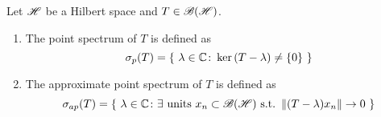 \documentclass[a4paper,11pt]{report}
\begin{document}
\begin{defn}
	Let $\mathscr{H}$ be a Hilbert space and $T \in \mathscr{B(H)}$.
	\begin{enumerate}[label=\arabic*)]
		\item The point spectrum of $T$ is defined as
		\begin{equation*}
			\sigma_p(T) = \{~ \lambda \in \mathbb{C} \colon \ker{(T-\lambda)} \neq \{0\}~\}
		\end{equation*}
		\item The approximate point spectrum of $T$ is defined as 
		\begin{equation*}
			\sigma_{ap}(T) =\{~\lambda \in \mathbb{C} \colon \exists~\text{units }{x_n} \subset \mathscr{B(H)} ~\text{s.t.}~ \left\lVert(T-\lambda)x_n\right\lVert \rightarrow 0~\}
		\end{equation*}
	\end{enumerate}
\end{defn}
\end{document}
